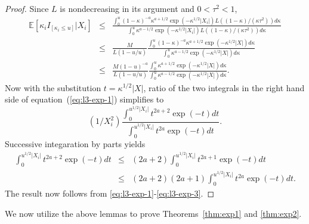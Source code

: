 \documentclass[sn-basic]{sn-jnl}%
\theoremstyle{thmstyleone}%
\begin{document}
\begin{proof}
Since $L$ is nondecreasing in its argument and $0<\tau^2<1$,
\begin{eqnarray}
\mathbb{E}[\kappa_i I_{[\kappa_i\leq u]}|X_i] & \leq & 
\frac{\int_{0}^{u} (1-\kappa)^{-a}\kappa^{a+1/2}\exp(-\kappa^{1/2}|X_i|)
L((1-\kappa)/(\kappa\tau^2))d\kappa}
{\int_{0}^u\kappa^{a-1/2}\exp(-\kappa^{1/2}|X_i|)L((1-\kappa)/(\kappa\tau^2))
d\kappa}
\nonumber\\ & \leq & \frac{M}{L(1-u/u)}
\frac{\int_{0}^{u} (1-\kappa)^{-a}\kappa^{a+1/2}\exp(-\kappa^{1/2}|X|)d\kappa}
{\int_{0}^{u}\kappa^{a-1/2}\exp(-\kappa^{1/2}|X|)d\kappa} \nonumber\\ & \leq &
\frac{M(1-u)^{-a}}{L(1-u/u)}
\frac{\int_{0}^{u}\kappa^{a+1/2}\exp(-\kappa^{1/2}|X|)d\kappa}
{\int_{0}^{u}\kappa^{a-1/2}\exp(-\kappa^{1/2}|X|)d\kappa}.
\label{eq:l3-exp-1}
\end{eqnarray}
Now with the substitution $t=\kappa^{1/2}|X|$, ratio of the two integrals in 
the right hand side of equation~(\ref{eq:l3-exp-1}) simplifies to 
\begin{equation}
(1/X_i^2)\frac{\int_{0}^{u^{1/2}|X_i|}t^{2a+2}\exp(-t)dt}
{\int_{0}^{u^{1/2}|X_i|}t^{2a}\exp(-t)dt}.
\label{eq:l3-exp-2}
\end{equation}
Successive integaration by parts yields
\begin{eqnarray}
\int_{0}^{u^{1/2}|X_i|}t^{2a+2}\exp(-t)dt & \leq &
(2a+2)\int_{0}^{u^{1/2}|X_i|}t^{2a+1}\exp(-t)dt \nonumber\\ & \leq &
(2a+2)(2a+1)\int_{0}^{u^{1/2}|X_i|}t^{2a}\exp(-t)dt.
\label{eq:l3-exp-3}
\end{eqnarray}
The result now follows from \eqref{eq:l3-exp-1}-\eqref{eq:l3-exp-3}.
\end{proof}

\noindent
We now utilize the above lemmas to prove Theorems~\ref{thm:exp1} and \ref{thm:exp2}.\\
\end{document}
